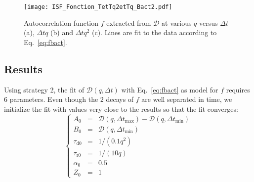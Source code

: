 \documentclass[prb,twocolumn,amsmath,amssymb]{revtex4-1}
\begin{document}
\begin{figure}
	\texttt{[image: ISF\_Fonction\_TetTq2etTq\_Bact2.pdf]}\\
	\caption{Autocorrelation function $f$ extracted from $\mathcal{D}$ at various $q$ versus $\Delta t$ (a), $\Delta tq$ (b) and $\Delta tq^2$ (c). Lines are fit to the data according to Eq.~\eqref{eq:fbact}.}
	\label{fig:ISFBacteria}
\end{figure}

\subsection{Results}
Using strategy 2, the fit of $\mathcal{D}(q, \Delta t)$ with Eq.~\eqref{eq:fbact} as model for $f$ requires 6 parameters. Even though the 2 decays of $f$ are well separated in time, we initialize the fit with values very close to the results so that the fit converges:
\begin{equation}
\left\{
\begin{array}{rcl}
A_0 &=& \mathcal{D} (q,\Delta t_\text{max}) - \mathcal{D} (q,\Delta t_\text{min}) \\
B_0 &=& \mathcal{D} (q,\Delta t_\text{min}) \\
\tau_\text{d0} &=& 1/(0.1 q^{2})\\
\tau_\text{r0} &=& 1/(10 q)\\
\alpha_0 &=& 0.5\\
Z_0 &=& 1
\end{array}
\right.
\end{equation}
\end{document}

